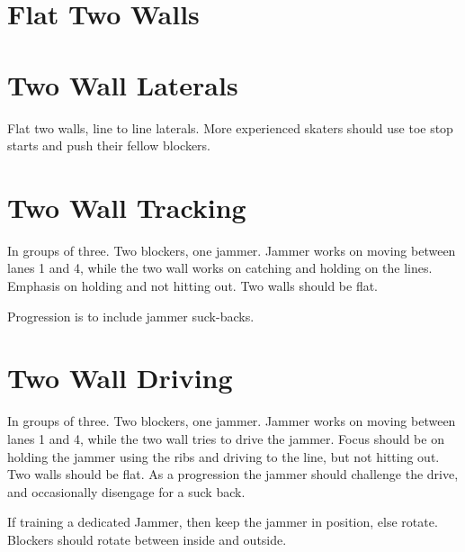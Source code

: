 \documentclass{journal}
\begin{document}
\section*{Flat Two Walls}





\section*{Two Wall Laterals}
\label{drill:two_wall:laterals}

Flat two walls, line to line laterals.  
More experienced skaters should use toe stop starts and push their fellow blockers.  

\section*{Two Wall Tracking}
\label{drill:two_wall:tracking}
In groups of three. 
Two blockers, one jammer.
Jammer works on moving between lanes 1 and 4, while the two wall works on catching and holding on the lines.
Emphasis on holding and not hitting out.      
Two walls should be flat.

Progression is to include jammer suck-backs.

\section*{Two Wall Driving}
\label{drill:two_wall:driving}
In groups of three. 
Two blockers, one jammer.
Jammer works on moving between lanes 1 and 4, while the two wall tries to drive the jammer.  
Focus should be on holding the jammer using the ribs and driving to the line, but not hitting out. 
Two walls should be flat.
As a progression the jammer should challenge the drive, and occasionally disengage for a suck back.

If training a dedicated Jammer, then keep the jammer in position, else rotate.
Blockers should rotate between inside and outside. 
\end{document}
